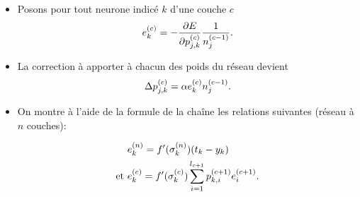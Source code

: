 \clearpage
{}

\begin{slide}

\begin{itemize}

	\item Posons pour tout neurone indicé $k$ d'une couche $c$
	\begin{equation*}
		e_{ k}^{ (c) } = - \frac{ \partial E }{ \partial p_{j, k}^{ (c) } } \frac{1}{ n_{ j }^{ (c-1) } }.
	\end{equation*}

	\item La correction à apporter à chacun des poids du réseau devient
	\begin{equation*}
		\Delta p_{j, k}^{ (c) } =  \alpha e_{ k}^{ (c) } n_{ j }^{ (c-1) }.
	\end{equation*} 

	\item On montre à l'aide de la formule de la chaîne les relations suivantes (réseau à $n$ couches):

	\begin{align*}
		& e_{ k}^{ (n) } = f'(\sigma_{ k }^{ (n) }) (t_k - y_k) \\
		\text{et } & e_{ k}^{ (c) } = f'(\sigma_{ k }^{ (c) }) \sum_{i=1}^{l_{c+1}} p_{k, i}^{ (c+1) } e_{ i}^{ (c+1) }.
	\end{align*}

\end{itemize}

\end{slide}